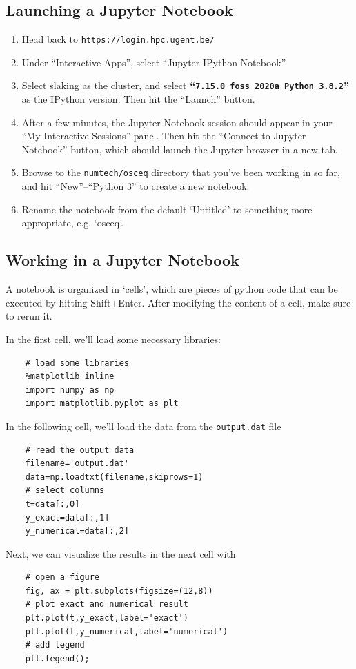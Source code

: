 \documentclass[a4paper]{article}
\begin{document}
\subsection{Launching a Jupyter Notebook}
%
\begin{enumerate}
	\item Head back to \texttt{https://login.hpc.ugent.be/}
	\item Under ``Interactive Apps'', select ``Jupyter IPython Notebook''
	\item Select slaking as the cluster, and select {\bfseries ``\texttt{7.15.0 foss 2020a Python 3.8.2}''} as the IPython version. Then hit the ``Launch'' button.
	\item After a few minutes, the Jupyter Notebook session should appear in your ``My Interactive Sessions'' panel. Then hit the ``Connect to Jupyter Notebook'' button, which should launch the Jupyter browser in a new tab.
	\item Browse to the \texttt{numtech/osceq} directory that you've been working in so far, and hit ``New''--``Python 3'' to create a new notebook.
	\item Rename the notebook from the default `Untitled' to something more appropriate, e.g. `osceq'.
\end{enumerate}
%
\subsection{Working in a Jupyter Notebook}
%
\par
A notebook is organized in `cells', which are pieces of python code that can be executed by hitting Shift+Enter. After modifying the content of a cell, make sure to rerun it.
%
\par
In the first cell, we'll load some necessary libraries:
%
\begin{verbatim}
    # load some libraries
    %matplotlib inline
    import numpy as np
    import matplotlib.pyplot as plt
\end{verbatim}
%
\par
In the following cell, we'll load the data from the \texttt{output.dat} file
%
\begin{verbatim}
    # read the output data
    filename='output.dat'
    data=np.loadtxt(filename,skiprows=1)
    # select columns
    t=data[:,0]
    y_exact=data[:,1]
    y_numerical=data[:,2]
\end{verbatim}
%
\par
Next, we can visualize the results in the next cell with
%
\begin{verbatim}
    # open a figure
    fig, ax = plt.subplots(figsize=(12,8))
    # plot exact and numerical result
    plt.plot(t,y_exact,label='exact')
    plt.plot(t,y_numerical,label='numerical')
    # add legend
    plt.legend();
\end{verbatim}
%
\end{document}
